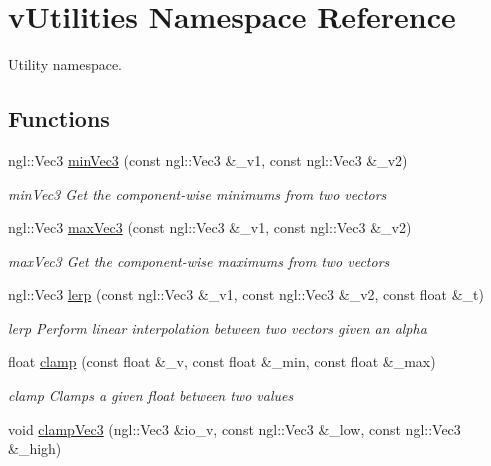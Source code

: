 \hypertarget{namespacevUtilities}{\section{v\-Utilities Namespace Reference}
\label{namespacevUtilities}
}


Utility namespace.  


\subsection*{Functions}
\begin{DoxyCompactItemize}
\item 
ngl\-::\-Vec3 \hyperlink{namespacevUtilities_aa7cc71c40bf034efd3a5834b2307a793}{min\-Vec3} (const ngl\-::\-Vec3 \&\-\_\-v1, const ngl\-::\-Vec3 \&\-\_\-v2)
\begin{DoxyCompactList}\small\item\em min\-Vec3 Get the component-\/wise minimums from two vectors \end{DoxyCompactList}\item 
ngl\-::\-Vec3 \hyperlink{namespacevUtilities_a8418b00f3f9e52b6f186b5e12ece8e15}{max\-Vec3} (const ngl\-::\-Vec3 \&\-\_\-v1, const ngl\-::\-Vec3 \&\-\_\-v2)
\begin{DoxyCompactList}\small\item\em max\-Vec3 Get the component-\/wise maximums from two vectors \end{DoxyCompactList}\item 
ngl\-::\-Vec3 \hyperlink{namespacevUtilities_adb4a633333be024bd738145162d53673}{lerp} (const ngl\-::\-Vec3 \&\-\_\-v1, const ngl\-::\-Vec3 \&\-\_\-v2, const float \&\-\_\-t)
\begin{DoxyCompactList}\small\item\em lerp Perform linear interpolation between two vectors given an alpha \end{DoxyCompactList}\item 
float \hyperlink{namespacevUtilities_a7e5df8352dd98340207816292e1ccfcf}{clamp} (const float \&\-\_\-v, const float \&\-\_\-min, const float \&\-\_\-max)
\begin{DoxyCompactList}\small\item\em clamp Clamps a given float between two values \end{DoxyCompactList}\item 
void \hyperlink{namespacevUtilities_a3828a1aa0cfbd068f42601e54f479359}{clamp\-Vec3} (ngl\-::\-Vec3 \&io\-\_\-v, const ngl\-::\-Vec3 \&\-\_\-low, const ngl\-::\-Vec3 \&\-\_\-high)

\end{DoxyCompactItemize}
